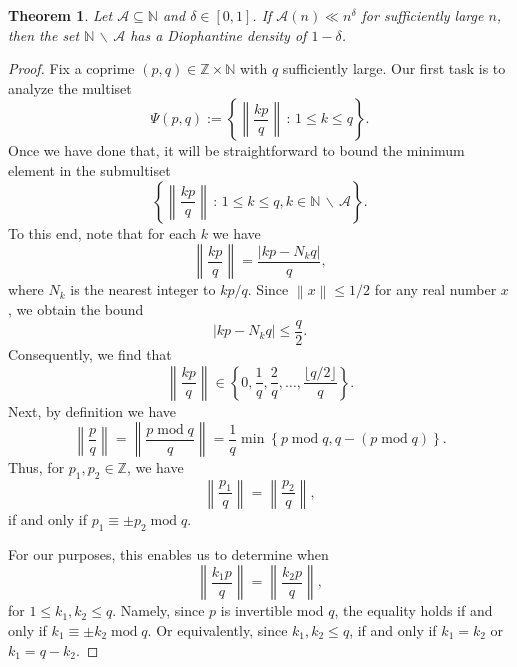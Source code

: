 \documentclass[reqno]{amsart}
\newtheorem{theorem}{Theorem}
\theoremstyle{definition}
\newcommand{\dnint}[1]{\left\|{#1}\right\|}
\renewcommand{\mod}{\;\mathrm{mod}\;}
\begin{document}
\begin{theorem}\label{thm:set_diff_ddense}
Let $\mathcal{A} \subseteq \mathbb{N}$ and $\delta \in [0,1]$. If $\mathcal{A}(n) \ll n^{\delta}$ for sufficiently large $n$, then the set $\mathbb{N} \,\backslash \,\mathcal{A}$ has a Diophantine density of $1-\delta$.
\end{theorem}
\begin{proof}
Fix a coprime $(p,q) \in \mathbb{Z} \times \mathbb{N}$ with $q$ sufficiently large.  Our first task is to analyze the multiset
\begin{equation*}
    \Psi(p,q):= \left\{\dnint{\frac{k p}{q}}\,:\,  1 \leq k \leq q \right\}.
\end{equation*}
Once we have done that, it will be straightforward to bound the minimum element in the submultiset
\begin{equation*}
    \left\{\dnint{\frac{k p}{q}}\,:\,  1 \leq k \leq q, k \in \mathbb{N}\,\backslash\,\mathcal{A} \right\}.
\end{equation*}
To this end, note that for each $k$ we have
\begin{equation*}
\dnint{\frac{kp}{q}} = \frac{\left\vert{kp-N_{k}q}\right\vert}{q},
\end{equation*}
where $N_{k}$ is the nearest integer to $kp/q$.  Since $\dnint{x} \leq 1/2$ for any real number $x$, we obtain the bound
\begin{equation*}
\vert{k p -  N_{k} q }\vert \leq \frac{q}{2}.
\end{equation*}
Consequently, we find that
\begin{equation*}
\dnint{\frac{kp}{q}} \in \left\{0,\frac{1}{q},\frac{2}{q},\dots,\frac{\lfloor{q/2}\rfloor}{q}\right\}.
\end{equation*}
Next, by definition we have
\begin{equation*}
    \dnint{\frac{p}{q}} = \dnint{\frac{p \mod q}{q}} = \frac{1}{q}\min\left\{p \mod q, q - (p \mod q)\right\}.
\end{equation*}
Thus, for $p_{1},p_{2} \in \mathbb{Z}$, we have
\begin{equation*}
    \dnint{\frac{p_{1}}{q}} = \dnint{\frac{p_{2}}{q}},
\end{equation*}
if and only if $p_{1} \equiv \pm p_{2} \mod q$.

For our purposes, this enables us to determine when
\begin{equation*}
    \dnint{\frac{k_{1} p}{q}} = \dnint{\frac{k_{2} p}{q}},
\end{equation*}
for $1\leq k_{1},k_{2}\leq q$.  Namely, since $p$ is invertible mod $q$, the equality holds if and only if $k_{1} \equiv \pm k_{2} \mod q$.  Or equivalently, since $k_{1},k_{2} \leq q$, if and only if $k_{1} = k_{2}$ or $k_{1} = q-k_{2}$.


\end{proof}
\end{document}

